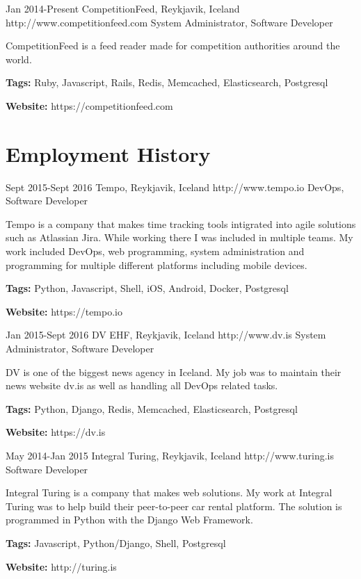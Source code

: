 \documentclass[10pt]{article} %
\begin{document}
\job
{Jan 2014-}{Present}
{CompetitionFeed, Reykjavik, Iceland}
{http://www.competitionfeed.com}
{System Administrator, Software Developer}
{CompetitionFeed is a feed reader made for competition authorities around the world. \\
\rule{0mm}{5mm}\textbf{Tags:} Ruby, Javascript, Rails, Redis, Memcached, Elasticsearch, Postgresql\\
\rule{0mm}{5mm}\textbf{Website:} https://competitionfeed.com
}


\section{Employment History}

\job
{Sept 2015-}{Sept 2016}
{Tempo, Reykjavik, Iceland}
{http://www.tempo.io}
{DevOps, Software Developer}
{Tempo is a company that makes time tracking tools intigrated into agile solutions such as Atlassian Jira.
While working there I was included in multiple teams. My work included DevOps, web programming, system administration and programming for multiple different platforms including mobile devices.\\
\rule{0mm}{5mm}\textbf{Tags:} Python, Javascript, Shell, iOS, Android, Docker, Postgresql\\
\rule{0mm}{5mm}\textbf{Website:} https://tempo.io
}


\job
{Jan 2015-}{Sept 2016}
{DV EHF, Reykjavik, Iceland}
{http://www.dv.is}
{System Administrator, Software Developer}
{DV is one of the biggest news agency in Iceland. My job was to maintain their news website dv.is as well as handling all DevOps related tasks.\\
\rule{0mm}{5mm}\textbf{Tags:} Python, Django, Redis, Memcached, Elasticsearch, Postgresql\\
\rule{0mm}{5mm}\textbf{Website:} https://dv.is
}


\job
{May 2014-}{Jan 2015}
{Integral Turing, Reykjavik, Iceland}
{http://www.turing.is}
{Software Developer}
{Integral Turing is a company that makes web solutions. My work at Integral Turing was to help build their peer-to-peer car rental platform.
The solution is programmed in Python with the Django Web Framework.\\
\rule{0mm}{5mm}\textbf{Tags:} Javascript, Python/Django, Shell, Postgresql\\
\rule{0mm}{5mm}\textbf{Website:} http://turing.is
}
\end{document}
